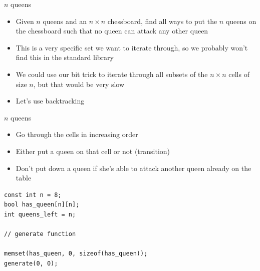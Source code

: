 \documentclass{beamer}
\begin{document}
\begin{frame}{$n$ queens}
    \begin{itemize}
        \item Given $n$ queens and an $n\times n$ chessboard, find all ways to
            put the $n$ queens on the chessboard such that no queen can attack
            any other queen

        \vspace{10pt}

        \item This is a very specific set we want to iterate through, so we probably won't find this in the standard library
        \item We could use our bit trick to iterate through all subsets of the $n\times n$ cells of size $n$, but that would be very slow
        \vspace{20pt}
        \item Let's use backtracking
    \end{itemize}
\end{frame}

\begin{frame}{$n$ queens}
    \begin{itemize}
        \item Go through the cells in increasing order
        \item Either put a queen on that cell or not (transition)
        \item Don't put down a queen if she's able to attack another queen already on the table
    \end{itemize}

    \vspace{10pt}

    \begin{verbatim}
const int n = 8;
bool has_queen[n][n];
int queens_left = n;

// generate function

memset(has_queen, 0, sizeof(has_queen));
generate(0, 0);
    \end{verbatim}
\end{frame}
\end{document}
